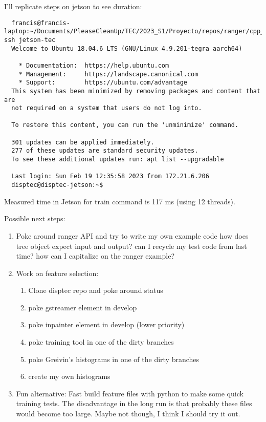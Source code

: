\documentclass[12pt,oneside]{book}
\begin{document}
I'll replicate steps on jetson to see duration:
\begin{lstlisting}
  francis@francis-laptop:~/Documents/PleaseCleanUp/TEC/2023_S1/Proyecto/repos/ranger/cpp_version/build$ ssh jetson-tec 
  Welcome to Ubuntu 18.04.6 LTS (GNU/Linux 4.9.201-tegra aarch64)
  
    * Documentation:  https://help.ubuntu.com
    * Management:     https://landscape.canonical.com
    * Support:        https://ubuntu.com/advantage
  This system has been minimized by removing packages and content that are
  not required on a system that users do not log into.
  
  To restore this content, you can run the 'unminimize' command.
  
  301 updates can be applied immediately.
  277 of these updates are standard security updates.
  To see these additional updates run: apt list --upgradable
  
  Last login: Sun Feb 19 12:35:58 2023 from 172.21.6.206
  disptec@disptec-jetson:~$ \end{lstlisting}

Measured time in Jetson for train command is 117 ms (using 12 threads).

Possible next steps:
\begin{enumerate}
  \item Poke around ranger API and try to write my own example code
    how does tree object expect input and output?
    can I recycle my test code from last time?
    how can I capitalize on the ranger example?

  \item Work on feature selection:
    \begin{enumerate}[label*=\arabic*.]
      \item Clone disptec repo and poke around status
      \item poke gstreamer element in develop
      \item poke inpainter element in develop (lower priority)
      \item poke training tool in one of the dirty branches
      \item poke Greivin's histograms in one of the dirty branches
      \item create my own histograms
    \end{enumerate}

  \item Fun alternative: Fast build feature files with python to make some
    quick training tests. The disadvantage in the long run is that probably these files would become too large. Maybe not though, I think I should try it out.
\end{enumerate}
\end{document}
